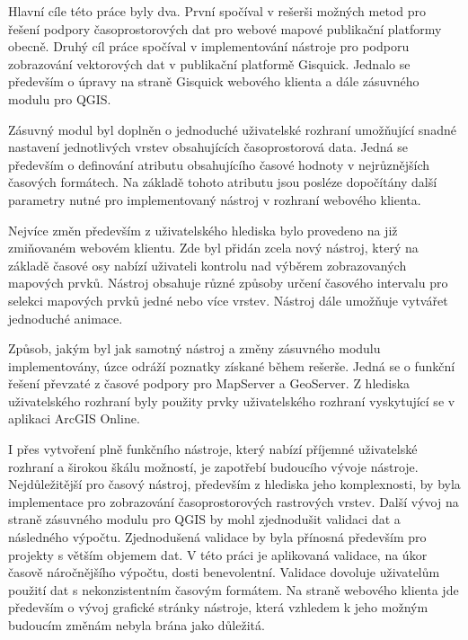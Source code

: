 \newpage
{}

Hlavní cíle této práce byly dva. První spočíval v rešerši možných
metod pro řešení podpory časoprostorových dat pro webové mapové
publikační platformy obecně. Druhý cíl práce spočíval v implementování
nástroje pro podporu zobrazování vektorových dat v publikační
platformě Gisquick. Jednalo se především o úpravy na straně Gisquick
webového klienta a dále zásuvného modulu pro QGIS.

Zásuvný modul byl doplněn o jednoduché uživatelské rozhraní umožňující
snadné nastavení jednotlivých vrstev obsahujících časoprostorová
data. Jedná se především o definování atributu obsahujícího časové
hodnoty v nejrůznějších časových formátech. Na základě tohoto atributu
jsou posléze dopočítány další parametry nutné pro implementovaný
nástroj v rozhraní webového klienta.

Nejvíce změn především z uživatelského hlediska bylo provedeno na již
zmiňovaném webovém klientu. Zde byl přidán zcela nový nástroj, který
na základě časové osy nabízí uživateli kontrolu nad výběrem
zobrazovaných mapových prvků. Nástroj obsahuje různé způsoby určení
časového intervalu pro selekci mapových prvků jedné nebo více
vrstev. Nástroj dále umožňuje vytvářet jednoduché animace.

Způsob, jakým byl jak samotný nástroj a změny zásuvného modulu
implementovány, úzce odráží poznatky získané během rešerše. Jedná se o
funkční řešení převzaté z časové podpory pro MapServer a
GeoServer. Z hlediska
uživatelského rozhraní byly použity prvky uživatelského rozhraní 
vyskytující se v aplikaci ArcGIS Online.

I přes vytvoření plně funkčního nástroje, který nabízí příjemné
uživatelské rozhraní a širokou škálu možností, je zapotřebí budoucího
vývoje nástroje. Nejdůležitější pro časový nástroj, především z
hlediska jeho komplexnosti, by byla implementace pro zobrazování
časoprostorových rastrových vrstev. Další vývoj na straně zásuvného modulu
pro QGIS by mohl zjednodušit validaci dat a následného výpočtu. 
Zjednodušená validace by byla přínosná především pro projekty s 
větším objemem dat. V
této práci je aplikovaná validace, na úkor časově
náročnějšího výpočtu, dosti benevolentní. Validace dovoluje 
uživatelům použití dat s nekonzistentním
časovým formátem. Na straně webového klienta jde především o vývoj grafické
stránky nástroje, která vzhledem k jeho možným budoucím změnám nebyla
brána jako důležitá.


